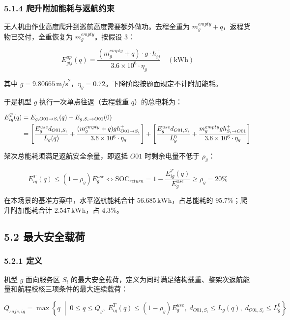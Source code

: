 \documentclass[withoutpreface,bwprint]{format}
\begin{document}
\subsubsection{5.1.4 爬升附加能耗与返航约束}
无人机由作业高度爬升到巡航高度需要额外做功。去程全重为 $m_g^{empty} + q$，返程货物已交付，全重恢复为 $m_g^{empty}$。按假设 3：

\begin{equation}
E_{gij}^{up}(q) = \frac{(m_g^{empty} + q) \cdot g \cdot h_{ij}^+}{3.6 \times 10^6 \cdot \eta_g} \quad (\text{kWh})
\end{equation}

其中 $g = 9.80665\,\text{m/s}^2$，$\eta_g = 0.72$。下降阶段按题面规定不计附加能耗。

于是机型 $g$ 执行一次单点往返（去程载重 $q$）的总电耗为：

\begin{align}
E_{ig}^T(q) &= E_{g, O01 \to S_i}(q) + E_{g, S_i \to O01}(0) \notag \\
&= \left[ \frac{E_g^{use} d_{O01, S_i}}{L_g(q)} + \frac{(m_g^{empty} + q) g h_{O01 \to S_i}^+}{3.6 \times 10^6 \cdot \eta_g} \right] + \left[ \frac{E_g^{use} d_{O01, S_i}}{L_g^0} + \frac{m_g^{empty} g h_{S_i \to O01}^+}{3.6 \times 10^6 \cdot \eta_g} \right]
\end{align}

架次总能耗须满足返航安全余量，即返抵 $O01$ 时剩余电量不低于 $\rho_g$：

\begin{equation}
E_{ig}^T(q) \le (1 - \rho_g) E_g^{use} \iff \text{SOC}_{return} = 1 - \frac{E_{ig}^T(q)}{E_g^{use}} \ge \rho_g = 20\%
\end{equation}

在本场景的基准方案中，水平巡航能耗合计 $56.685\,\text{kWh}$，占总能耗的 $95.7\%$；爬升附加能耗合计 $2.547\,\text{kWh}$，占 $4.3\%$。

\subsection{5.2 最大安全载荷}

\subsubsection{5.2.1 定义}
机型 $g$ 面向服务区 $S_i$ 的最大安全载荷，定义为同时满足结构载重、整架次返航能量和航程校核三项条件的最大连续载荷：

\begin{equation}
Q_{safe, ig} = \max \left\{ q \;\middle|\; 0 \le q \le Q_g, \; E_{ig}^T(q) \le (1 - \rho_g) E_g^{use}, \; d_{O01, S_i} \le L_g(q), \; d_{O01, S_i} \le L_g^0 \right\}
\end{equation}
\end{document}
